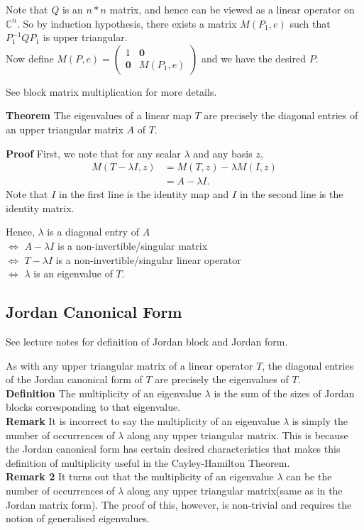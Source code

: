 \documentclass{article}
\begin{document}
Note that $Q$ is an $n*n$ matrix, and hence can be viewed as a linear operator on $\mathbb{C}^n$. So by induction hypothesis, there exists a matrix $M(P_1,e)$ such that $P_1^{-1}QP_1$ is upper triangular.\\
Now define $M(P,e)=\begin{pmatrix}
	1 & \mathbf{0}\\
	\mathbf{0} & M(P_1, e)
\end{pmatrix} 
$ and we have the desired $P$.

See block matrix multiplication for more details.


\textbf{Theorem} The eigenvalues of a linear map $T$ are precisely the diagonal entries of an upper triangular matrix $A$ of $T$. 

\textbf{Proof}
First, we note that for any scalar $\lambda$ and any basis $z$, 
\begin{align*}
	M(T-\lambda I, z)&=M(T,z)-\lambda M(I,z)\\
	&=A-\lambda I.
\end{align*}
Note that $I$ in the first line is the identity map and $I$ in the second line is the identity matrix. 
 
Hence, $\lambda$ is a diagonal entry of $A$ \\
$\iff$ $A-\lambda I$ is a non-invertible/singular matrix \\
$\iff$ $T-\lambda I$ is a non-invertible/singular linear operator\\
$\iff$ $\lambda$ is an eigenvalue of $T$.


\subsection{Jordan Canonical Form}
See lecture notes for definition of Jordan block and Jordan form.

As with any upper triangular matrix of a linear operator $T$, the diagonal entries of the Jordan canonical form of $T$ are precisely the eigenvalues of $T$.\\
\textbf{Definition} The multiplicity of an eigenvalue $\lambda$ is the sum of the sizes of Jordan blocks corresponding to that eigenvalue.\\
\textbf{Remark} It is incorrect to say the multiplicity of an eigenvalue $\lambda$ is simply the number of occurrences of $\lambda$ along any upper triangular matrix. This is because the Jordan canonical form has certain desired characteristics that makes this definition of multiplicity useful in the Cayley-Hamilton Theorem.\\
\textbf{Remark 2} It turns out that the multiplicity of an eigenvalue $\lambda$ can be the number of occurrences of $\lambda$ along any upper triangular matrix(same as in the Jordan matrix form). The proof of this, however, is non-trivial and requires the notion of generalised eigenvalues. 
\end{document}
